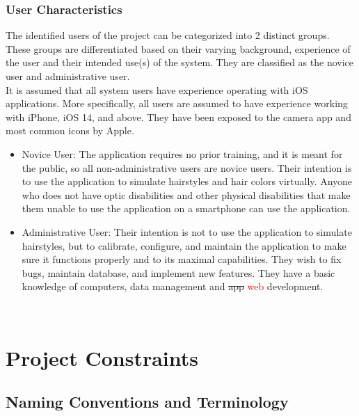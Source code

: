 \documentclass[12pt]{article}
\begin{document}
\subsubsection{User Characteristics}
The identified users of the project can be categorized into 2 distinct groups. These groups are differentiated based on their varying background, experience of the user and their intended use(s) of the system. They are classified as the novice user and administrative user. \\
\newline
\noindent
It is assumed that all system users have experience operating with iOS applications. More specifically, all users are assumed to have experience working with iPhone, iOS 14, and above. They have been exposed to the camera app and most common icons by Apple.
\begin{itemize}
    \item Novice User: The application requires no prior training, and it is meant for the public, so all non-administrative users are novice users. Their intention is to use the application to simulate hairstyles and hair colors virtually. Anyone who does not have optic disabilities and other physical disabilities that make them unable to use the application on a smartphone can use the application.
    \item Administrative User: Their intention is not to use the application to simulate hairstyles, but to calibrate, configure, and maintain the application to make sure it functions properly and to its maximal capabilities. They wish to fix bugs, maintain database, and implement new features. They have a basic knowledge of computers, data management and \sout{app} \textcolor{red}{web} development.
    
\end{itemize}

~\newpage

\section{Project Constraints}

\subsection{Naming Conventions and Terminology}
\end{document}

